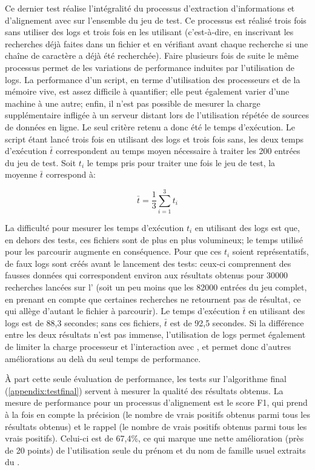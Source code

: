 Ce dernier test réalise l'intégralité du processus d'extraction d'informations et d'alignement avec \wkd{} sur l'ensemble du jeu de test. Ce processus est réalisé trois fois sans utiliser des \glspl{log} et trois fois en les utilisant (c'est-à-dire, en inscrivant les recherches déjà faites dans un fichier et en vérifiant avant chaque recherche si une chaîne de caractère a déjà été recherchée). Faire plusieurs fois de suite le même processus permet de les variations de performance induites par l'utilisation de \glspl{log}. La performance d'un script, en terme d'utilisation des processeurs et de la mémoire vive, est assez difficile à quantifier; elle peut également varier d'une machine à une autre; enfin, il n'est pas possible de mesurer la charge supplémentaire infligée à un serveur distant lors de l'utilisation répétée de sources de données en ligne. Le seul critère retenu a donc été le temps d'exécution. Le script étant lancé trois fois en utilisant des \glspl{log} et trois fois sans, les deux temps d'exécution \(\bar{t}\) correspondent au temps moyen nécessaire à traiter les 200 entrées du jeu de test. Soit \(t_i\) le temps pris pour traiter une fois le jeu de test, la moyenne \(\bar{t}\) correspond à:

\begin{displaymath}
	\bar{t} = \frac{1}{3}\sum_{i=1}^{3}t_i
\end{displaymath}

La difficulté pour mesurer les temps d'exécution \(t_i\) en utilisant des \glspl{log} est que, en dehors des tests, ces fichiers sont de plus en plus volumineux; le temps utilisé pour les parcourir augmente en conséquence. Pour que ces \(t_i\) soient représentatifs, de faux \glspl{log} sont créés avant le lancement des tests: ceux-ci comprennent des fausses données qui correspondent environ aux résultats obtenus pour 30000 recherches lancées sur l'\api{} (soit un peu moins que les 82000 entrées du jeu complet, en prenant en compte que certaines recherches ne retournent pas de résultat, ce qui allège d'autant le fichier à parcourir). Le temps d'exécution \(\bar{t}\) en utilisant des \glspl{log} est de 88,3 secondes; sans ces fichiers, \(\bar{t}\) est de 92,5 secondes. Si la différence entre les deux résultats n'est pas immense, l'utilisation de \glspl{log} permet également de limiter la charge processeur et l'interaction avec \wkd{}, et permet donc d'autres améliorations au delà du seul temps de performance.

À part cette seule évaluation de performance, les tests sur l'algorithme final (\ref{appendix:testfinal}) servent à mesurer la qualité des résultats obtenus. La mesure de performance pour un processus d'alignement est le \gls{score F1}, qui prend à la fois en compte la précision (le nombre de vrais positifs obtenus parmi tous les résultats obtenus) et le rappel (le nombre de vrais positifs obtenus parmi tous les vrais positifs). Celui-ci est de 67,4\%, ce qui marque une nette amélioration (près de 20 points) de l'utilisation seule du prénom et du nom de famille usuel extraits du \tname{}. 

